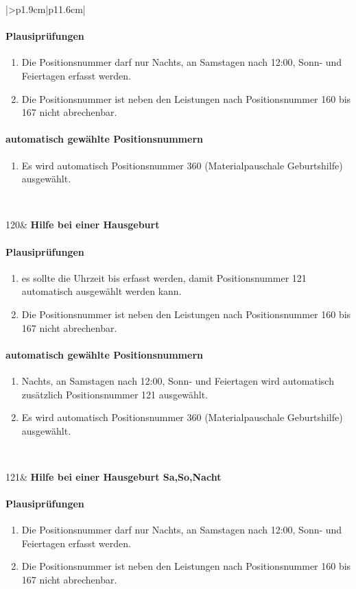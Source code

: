 \begin{mpsupertabular}{|>{\centering}p{1.9cm}|p{11.6cm}|}
\paragraph{Plausiprüfungen}
\begin{enumerate}
\item
Die Positionsnummer darf nur Nachts, an Samstagen nach 12:00, 
Sonn- und Feiertagen erfasst werden.
\item
Die Positionsnummer ist neben den Leistungen nach Positionsnummer 160 bis
167 nicht abrechenbar.
\end{enumerate}
\paragraph{automatisch gewählte Positionsnummern}
\begin{enumerate}
\item
Es wird automatisch Positionsnummer 360 (Materialpauschale Geburtshilfe)
ausgewählt.
\end{enumerate}
\\ \hline


120&
\textbf{Hilfe bei einer Hausgeburt}
\paragraph{Plausiprüfungen}
\begin{enumerate}
\item
es sollte die Uhrzeit bis erfasst werden, damit Positionsnummer 121 
automatisch ausgewählt werden kann.
\item
Die Positionsnummer ist neben den Leistungen nach Positionsnummer 160 bis
167 nicht abrechenbar.
\end{enumerate}
\paragraph{automatisch gewählte Positionsnummern}
\begin{enumerate}
\item
Nachts, an Samstagen nach 12:00, Sonn- und Feiertagen wird automatisch 
zusätzlich Positionsnummer 121 ausgewählt.
\item
Es wird automatisch Positionsnummer 360 (Materialpauschale Geburtshilfe)
ausgewählt.
\end{enumerate}
\\ \hline


121&
\textbf{Hilfe bei einer Hausgeburt Sa,So,Nacht}
\paragraph{Plausiprüfungen}
\begin{enumerate}
\item
Die Positionsnummer darf nur Nachts, an Samstagen nach 12:00, 
Sonn- und Feiertagen erfasst werden.
\item
Die Positionsnummer ist neben den Leistungen nach Positionsnummer 160 bis
167 nicht abrechenbar.
\end{enumerate}

\end{mpsupertabular}
